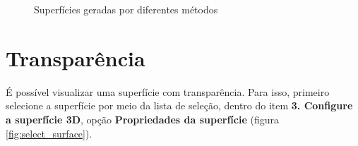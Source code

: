 \begin{figure}[!htb]
  \centering
  \hfill
  \hfill  
  \caption{Superfícies geradas por diferentes métodos }
  \label{fig:surf_method}
\end{figure}



\section{Transparência}

É possível visualizar uma superfície com transparência. Para isso, primeiro selecione a
superfície por meio da lista de seleção, dentro do item \textbf{3. Configure a superfície 3D}, opção
\textbf{Propriedades da superfície} (figura \ref{fig:select_surface}).

